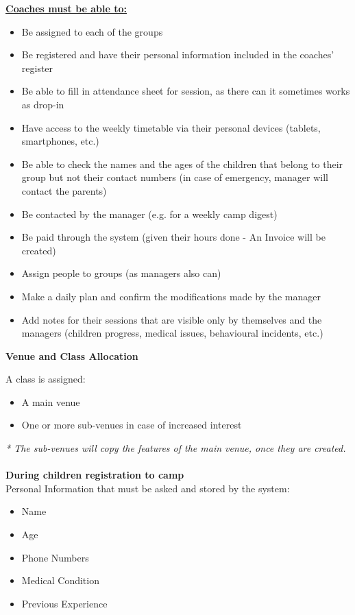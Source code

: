 \documentclass{l3proj}
\begin{document}
\textbf{\underline{Coaches must be able to:}}
	\begin{itemize}
	\item Be assigned to each of the groups
	\item Be registered and have their personal information included in the coaches’ register
	\item Be able to fill in attendance sheet for session, as there can it sometimes works as drop-in
	\item Have access to the weekly timetable via their personal devices (tablets, smartphones, etc.)
	\item Be able to check the names and the ages of the children that belong to their group but not their contact numbers (in case of emergency, manager will contact the parents)
	\item Be contacted by the manager (e.g. for a weekly camp digest)
	\item Be paid through the system (given their hours done - An Invoice will be created)
	\item Assign people to groups (as managers also can)
	\item Make a daily plan and confirm the modifications made by the manager
	\item Add notes for their sessions that are visible only by themselves and the managers (children progress, medical issues, behavioural incidents, etc.)
	\end{itemize}
\textbf{\Large{Venue and Class Allocation}}
\par
A class is assigned:
	\begin{itemize}
	\item A main venue
	\item One or more sub-venues in case of increased interest
	\end{itemize}
\emph{* The sub-venues will copy the features of the main venue, once they are created.}\\
\\
\textbf{During children registration to camp}\\
Personal Information that must be asked and stored by the system:
	\begin{itemize}
	\item Name
	\item Age
	\item Phone Numbers
	\item Medical Condition
	\item Previous Experience
	\end{itemize}
\end{document}

